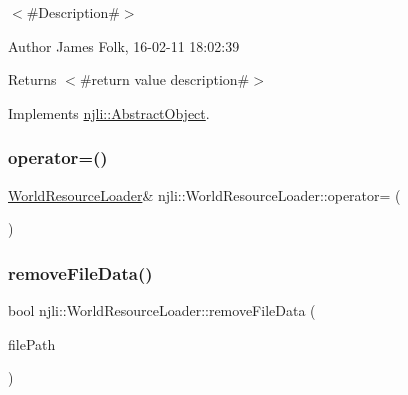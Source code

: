 $<$\#\+Description\#$>$ 

\begin{DoxyAuthor}{Author}
James Folk, 16-\/02-\/11 18\+:02\+:39
\end{DoxyAuthor}
\begin{DoxyReturn}{Returns}
$<$\#return value description\#$>$ 
\end{DoxyReturn}


Implements \mbox{\hyperlink{classnjli_1_1_abstract_object_afc07f4138bd3003910e7aa7fa0fe11ad}{njli\+::\+Abstract\+Object}}.

\mbox{\label{classnjli_1_1_world_resource_loader_a1c317a6c19a9bbd4e578a1bc70784d51}} 
\subsubsection{\texorpdfstring{operator=()}{operator=()}}
{\footnotesize\ttfamily \mbox{\hyperlink{classnjli_1_1_world_resource_loader}{World\+Resource\+Loader}}\& njli\+::\+World\+Resource\+Loader\+::operator= (\begin{DoxyParamCaption}\item[{const \mbox{\hyperlink{classnjli_1_1_world_resource_loader}{World\+Resource\+Loader}} \&}]{ }\end{DoxyParamCaption})\hspace{0.3cm}{\ttfamily [private]}}

\mbox{\label{classnjli_1_1_world_resource_loader_ac3a031dc592f5907a2e7579c4a98739f}} 
\subsubsection{\texorpdfstring{remove\+File\+Data()}{removeFileData()}}
{\footnotesize\ttfamily bool njli\+::\+World\+Resource\+Loader\+::remove\+File\+Data (\begin{DoxyParamCaption}\item[{const char $\ast$}]{file\+Path }\end{DoxyParamCaption})\hspace{0.3cm}{\ttfamily [protected]}}


